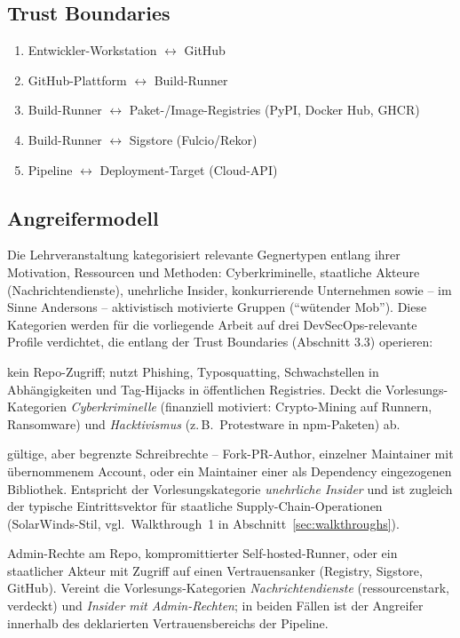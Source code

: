 \documentclass[12pt, a4paper]{scrartcl}
\begin{document}
\subsection{Trust Boundaries}
\begin{enumerate}[leftmargin=1.4em]
  \item Entwickler-Workstation $\leftrightarrow$ GitHub
  \item GitHub-Plattform $\leftrightarrow$ Build-Runner
  \item Build-Runner $\leftrightarrow$ Paket-/Image-Registries (PyPI, Docker Hub, GHCR)
  \item Build-Runner $\leftrightarrow$ Sigstore (Fulcio/Rekor)
  \item Pipeline $\leftrightarrow$ Deployment-Target (Cloud-API)
\end{enumerate}

\subsection{Angreifermodell}\label{sec:adversary}
Die Lehrveranstaltung kategorisiert relevante Gegnertypen entlang ihrer
Motivation, Ressourcen und Methoden: Cyberkriminelle, staatliche
Akteure (Nachrichtendienste), unehrliche Insider, konkurrierende
Unternehmen sowie -- im Sinne Andersons -- aktivistisch motivierte
Gruppen (\enquote{wütender Mob}). Diese Kategorien werden für die
vorliegende Arbeit auf drei DevSecOps-relevante Profile verdichtet,
die entlang der Trust Boundaries (Abschnitt 3.3) operieren:

\begin{description}[leftmargin=1.4em,style=nextline]
  \item[A1 -- Externer Angreifer] kein Repo-Zugriff; nutzt Phishing,
        Typosquatting, Schwachstellen in Abhängigkeiten und
        Tag-Hijacks in öffentlichen Registries.
        Deckt die Vorlesungs-Kategorien
        \emph{Cyberkriminelle} (finanziell motiviert: Crypto-Mining auf
        Runnern, Ransomware) und \emph{Hacktivismus} (z.\,B.\
        Protestware in npm-Paketen) ab.
  \item[A2 -- Kompromittierter Mitwirkender] gültige, aber begrenzte
        Schreibrechte -- Fork-PR-Author, einzelner Maintainer mit
        übernommenem Account, oder ein Maintainer einer als Dependency
        eingezogenen Bibliothek. Entspricht der Vorlesungskategorie
        \emph{unehrliche Insider} und ist zugleich der typische
        Eintrittsvektor für staatliche Supply-Chain-Operationen
        (SolarWinds-Stil, vgl.\ Walkthrough~1 in
        Abschnitt~\ref{sec:walkthroughs}).
  \item[A3 -- Insider/Plattform] Admin-Rechte am Repo, kompromittierter
        Self-hosted-Runner, oder ein staatlicher Akteur mit
        Zugriff auf einen Vertrauensanker (Registry, Sigstore, GitHub).
        Vereint die Vorlesungs-Kategorien \emph{Nachrichtendienste}
        (ressourcenstark, verdeckt) und \emph{Insider mit
        Admin-Rechten}; in beiden Fällen ist der Angreifer
        innerhalb des deklarierten Vertrauensbereichs der Pipeline.
\end{description}
\end{document}

